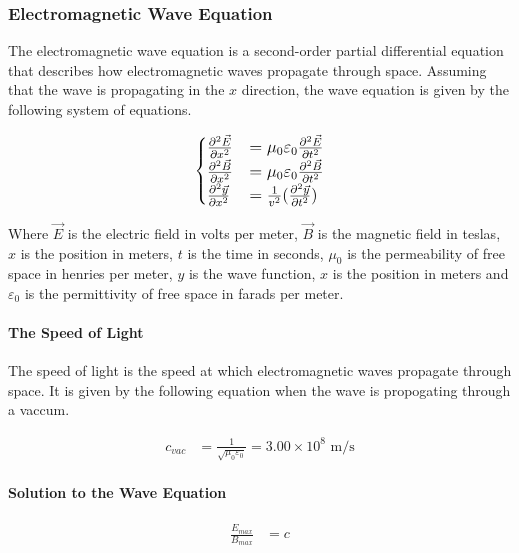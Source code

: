 \pagebreak

\subsubsection*{Electromagnetic Wave Equation}
The electromagnetic wave equation is a second-order partial differential equation that describes how electromagnetic waves propagate through space.
Assuming that the wave is propagating in the $x$ direction, the wave equation is given by the following system of equations.

\begin{align*}
    \large
\begin{cases}
    \frac{\partial^2\vec{E}}{\partial x^2} &= \mu_0\varepsilon_0\frac{\partial^2\vec{E}}{\partial t^2}\\
    \frac{\partial^2\vec{B}}{\partial x^2} &= \mu_0\varepsilon_0\frac{\partial^2\vec{B}}{\partial t^2}\\
    \frac{\partial^2 \vec{y}}{\partial x^2} &= \frac{1}{v^2}(\frac{\partial^2 \vec{y}}{\partial t^2})
\end{cases}
\end{align*}
    
Where $\vec{E}$ is the electric field in volts per meter, $\vec{B}$ is the magnetic field in teslas, $x$ is the position in meters, $t$ is the time 
in seconds, $\mu_0$ is the permeability of free space in henries per meter, $y$ is the wave function, $x$ is the position in meters and $\varepsilon_0$ 
is the permittivity of free space in farads per meter.\\

\paragraph{The Speed of Light}
The speed of light is the speed at which electromagnetic waves propagate through space. It is given by the following equation when the wave is propogating
through a vaccum.

\begin{align*}
    c_{vac} &= \frac{1}{\sqrt{\mu_0\varepsilon_0}} = 3.00 \times 10^8 \text{ m/s}
\end{align*}

\paragraph*{Solution to the Wave Equation}

\begin{align*}
    \frac{E_{max}}{B_{max}} &= c
\end{align*}

